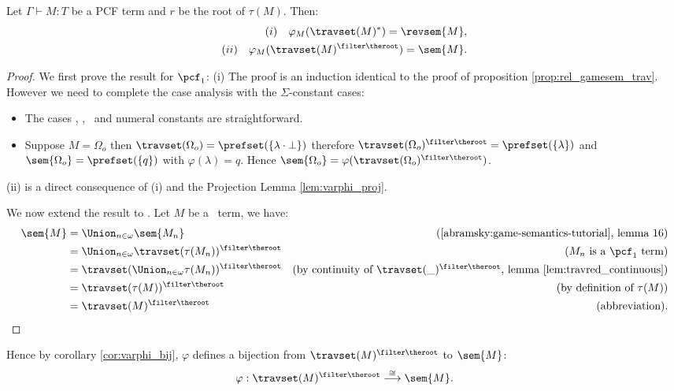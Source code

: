 \begin{proposition}
Let $\Gamma \vdash M : T$ be a PCF term and $r$ be the root of
$\tau(M)$. Then:
\begin{align*}
(i)  \quad\varphi_M(\travset(M)^*) = \revsem{M},  \\
(ii) \quad \varphi_M(\travset(M)^{\filter \theroot}) = \sem{M}.
\end{align*}
\end{proposition}
\begin{proof}
We first prove the result for $\pcf_1$: (i) The proof is an
induction identical to the proof of proposition
\ref{prop:rel_gamesem_trav}. However we need to complete the case
analysis with the $\Sigma$-constant cases:
\begin{itemize}
\item The cases \pcfsucc, \pcfpred, \pcfcond\ and numeral constants are straightforward.

\item Suppose $M = \Omega_o$ then $\travset(\Omega_o) = \prefset ( \{ \lambda \cdot \bot \} )$ therefore
$\travset(\Omega_o)^{\filter \theroot} = \prefset( \{ \lambda \}
)$ and $\sem{\Omega_o} = \prefset( \{ q \})$ with
$\varphi(\lambda) = q$. Hence $\sem{\Omega_o} = \varphi
(\travset(\Omega_o)^{\filter \theroot})$.
\end{itemize}
(ii) is a direct consequence of (i) and the Projection Lemma
\ref{lem:varphi_proj}. \vspace{10pt}

\noindent We now extend the result to \pcf. Let $M$ be a \pcf\ term,
we have:
\begin{align*}
\sem{M} &= \Union_{n\in\omega} \sem{M_n} & (\mbox{\cite{abramsky:game-semantics-tutorial}, lemma 16})\\
&= \Union_{n\in\omega} \travset(\tau(M_n))^{\filter \theroot} & (M_n \mbox{ is a $\pcf_1$ term}) \\
&= \travset(\Union_{n\in\omega} \tau(M_n) )^{\filter \theroot} & (\mbox{by continuity of $\travset(\_)^{\filter \theroot}$, lemma \ref{lem:travred_continuous}}) \\
&= \travset(\tau(M))^{\filter \theroot} & (\mbox{by definition of } \tau(M)) \\
&= \travset(M)^{\filter \theroot} & (\mbox{abbreviation}).
\end{align*}
\end{proof}

Hence by corollary \ref{cor:varphi_bij}, $\varphi$ defines a
bijection from $\travset(M)^{\filter \theroot}$ to $\sem{M}$:
$$\varphi : \travset(M)^{\filter \theroot} \stackrel{\cong}{\longrightarrow} \sem{M}.$$

